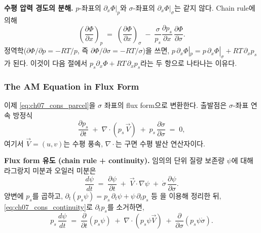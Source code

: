 
\medskip



\noindent\textbf{수평 압력 경도의 분해.}
$p$-좌표의 $\partial_x \Phi|_p$와 $\sigma$-좌표의 $\partial_x \Phi|_\sigma$는
같지 않다.  Chain rule에 의해
\begin{equation}\label{eq:ch07_cons_pgrad_split}
  \left(\frac{\partial \Phi}{\partial x}\right)_p
  \;=\;
  \left(\frac{\partial \Phi}{\partial x}\right)_\sigma
  \;-\;
  \frac{\sigma}{p_s}\frac{\partial p_s}{\partial x}\,
  \frac{\partial \Phi}{\partial \sigma}.
\end{equation}
정역학($\partial\Phi/\partial p = -RT/p$, 즉 $\partial\Phi/\partial\sigma =
-RT/\sigma$)을 쓰면, $p\,\partial_x\Phi|_p = p\,\partial_x\Phi|_\sigma +
RT\,\partial_x p_s$가 된다.  이것이 다음 절에서 \emph{$p_s \partial_x\Phi +
RT\,\partial_x p_s$}라는 두 항으로 나타나는 이유다.

\subsubsection{The AM Equation in Flux Form}

이제 \eqref{eq:ch07_cons_parcel}을 $\sigma$ 좌표의 flux form으로 변환한다.
출발점은 $\sigma$-좌표 연속 방정식
\begin{equation}\label{eq:ch07_cons_continuity}
  \frac{\partial p_s}{\partial t}
  \;+\;
  \nabla\!\cdot\!(p_s\,\vec V)
  \;+\;
  p_s\,\frac{\partial \dot\sigma}{\partial \sigma}
  \;=\; 0,
\end{equation}
여기서 $\vec V = (u,v)$는 수평 풍속, $\nabla\cdot$는 구면 수평 발산
연산자이다.

\medskip



\noindent\textbf{Flux form 유도 (chain rule + continuity).}
임의의 단위 질량 보존량 $\psi$에 대해 라그랑지 미분과 오일러 미분은
\[
  \frac{d \psi}{dt}
  \;=\;
  \frac{\partial \psi}{\partial t}
  \;+\;
  \vec V\!\cdot\!\nabla \psi
  \;+\;
  \dot\sigma\,\frac{\partial \psi}{\partial \sigma}.
\]
양변에 $p_s$를 곱하고, $\partial_t(p_s\psi)
= p_s\,\partial_t\psi + \psi\,\partial_t p_s$ 등 을 이용해
정리한 뒤, \eqref{eq:ch07_cons_continuity}로 $\partial_t p_s$를 소거하면,
\begin{equation}\label{eq:ch07_cons_flux_master}
  p_s\,\frac{d \psi}{dt}
  \;=\;
  \frac{\partial}{\partial t}(p_s\psi)
  \;+\;
  \nabla\!\cdot\!(p_s\psi\vec V)
  \;+\;
  \frac{\partial}{\partial\sigma}(p_s\psi\dot\sigma).
\end{equation}

